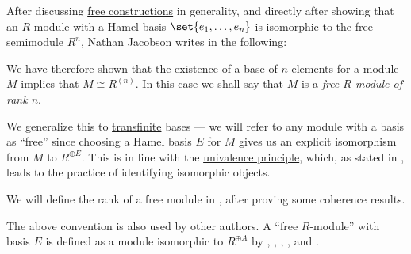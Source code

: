 \begin{remark}\label{rem:free_module}
  After discussing \hyperref[con:free_construction]{free constructions} in generality, and directly after showing that an \hyperref[def:module]{\( R \)-module} with a \hyperref[def:hamel_basis]{Hamel basis} \( \set{ e_1, \ldots, e_n } \)  is isomorphic to the \hyperref[def:free_semimodule]{free semimodule} \( R^n \), Nathan Jacobson writes in \cite[171]{Jacobson1985BasicAlgebraI} the following:
  \begin{displayquote}
    We have therefore shown that the existence of a base of \( n \) elements for a module \( M \) implies that \( M \cong R^{(n)} \). In this case we shall say that \( M \) is a \textit{free \( R \)-module of rank \( n \)}.
  \end{displayquote}

  We generalize this to \hyperref[con:transfinitum]{transfinite} bases --- we will refer to any module with a basis as \enquote{free} since choosing a Hamel basis \( E \) for \( M \) gives us an explicit isomorphism from \( M \) to \( R^{\oplus E} \). This is in line with the \hyperref[con:univalence_principle]{univalence principle}, which, as stated in , leads to the practice of identifying isomorphic objects.

  We will define the rank of a free module in , after proving some coherence results.
\end{remark}
\begin{comments}
  \item The above convention is also used by other authors. A \enquote{free \( R \)-module} with basis \( E \) is defined as a module isomorphic to \( R^{\oplus A} \) by
  ,
  ,
  ,
  ,
   and
  .
\end{comments}


